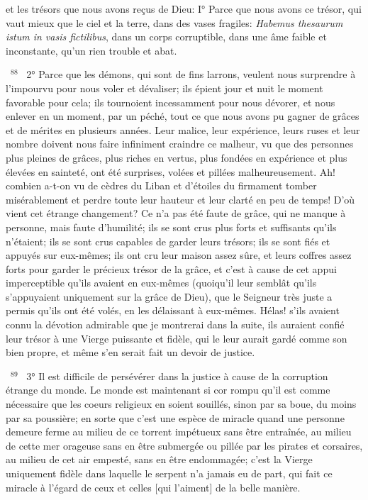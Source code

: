 \documentclass[paper=a5,pagesize=pdftex,fontsize=15pt,headinclude=on,twoside=off]{scrbook}
\newcommand{\negphantom}[1]{\settowidth{\dimen0}{#1}\hspace*{-\dimen0}}
\newcommand{\versenb}[1]{\par \vspace{10pt}~\negphantom{~${}^{#1}$~}${}^{#1}$~}
\newcommand{\latin}[1]{\emph{#1}}
\begin{document}
et les trésors que nous avons reçus de Dieu:
I° Parce que nous avons ce trésor, qui vaut mieux que le ciel et la terre, dans des vases fragiles: \latin{Habemus
thesaurum istum in vasis fictilibus}, dans un corps corruptible, dans une âme faible et inconstante, qu'un rien
trouble et abat.
\versenb{88} 2° Parce que les démons, qui sont de fins larrons, veulent nous surprendre à l'impourvu pour nous voler et
dévaliser; ils épient jour et nuit le moment favorable pour cela; ils tournoient incessamment pour nous dévorer, et
nous enlever en un moment, par un péché, tout ce que nous avons pu gagner de grâces et de mérites en plusieurs
années. Leur malice, leur expérience, leurs ruses et leur nombre doivent nous faire infiniment craindre ce malheur,
vu que des personnes plus pleines de grâces, plus riches en vertus, plus fondées en expérience et plus élevées
en sainteté, ont été surprises, volées et pillées malheureusement. Ah! combien a-t-on vu de cèdres du Liban et
d'étoiles du firmament tomber misérablement et perdre toute leur hauteur et leur clarté en peu de temps! D'où vient
cet étrange changement? Ce n'a pas été faute de grâce, qui ne manque à personne, mais faute d'humilité; ils se
sont crus plus forts et suffisants qu'ils n'étaient; ils se sont crus capables de garder leurs trésors; ils se sont fiés et
appuyés sur eux-mêmes; ils ont cru leur maison assez sûre, et leurs coffres assez forts pour garder le précieux
trésor de la grâce, et c'est à cause de cet appui imperceptible qu'ils avaient en eux-mêmes (quoiqu'il leur semblât
qu'ils s'appuyaient uniquement sur la grâce de Dieu), que le Seigneur très juste a permis qu'ils ont été volés, en les
délaissant à eux-mêmes. Hélas! s'ils avaient connu la dévotion admirable que je montrerai dans la suite, ils
auraient confié leur trésor à une Vierge puissante et fidèle, qui le leur aurait gardé comme son bien propre, et
même s'en serait fait un devoir de justice.
\versenb{89} 3° Il est difficile de persévérer dans la justice à cause de la corruption étrange du monde. Le monde est
maintenant si cor rompu qu'il est comme nécessaire que les coeurs religieux en soient souillés, sinon par sa boue,
du moins par sa poussière; en sorte que c'est une espèce de miracle quand une personne demeure ferme au
milieu de ce torrent impétueux sans être entraînée, au milieu de cette mer orageuse sans en être submergée ou
pillée par les pirates et corsaires, au milieu de cet air empesté, sans en être endommagée; c'est la Vierge
uniquement fidèle dans laquelle le serpent n'a jamais eu de part, qui fait ce miracle à l'égard de ceux et celles [qui
l'aiment] de la belle manière.
\end{document}
